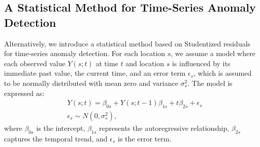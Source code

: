 \documentclass[11pt]{article}
\begin{document}
\subsection{A Statistical Method for Time-Series Anomaly Detection}\label{sec:Outlier Detection for Individual Location}
Alternatively, we introduce a statistical method based on Studentized residuals for time-series anomaly detection. For each location $s$, we assume a model where each observed value $Y(s;t)$ at time $t$ and location $s$ is influenced by its immediate past value, the current time, and an error term $\epsilon_s$, which is assumed to be normally distributed with mean zero and variance $\sigma_s^2$. The model is expressed as:
\begin{align}
	&Y(s;t) = \beta_{0s} + Y(s;t-1)\beta_{1s} + t\beta_{2s}+\epsilon_s \\
	&\epsilon_s \sim N(0,\sigma_s^2) \nonumber,
\end{align}
	where $\beta_{0s}$ is the intercept, $\beta_{1s}$ represents the autoregressive relationship, $\beta_{2s}$ captures the temporal trend, and $\epsilon_s$ is the error term.
	
\end{document}
